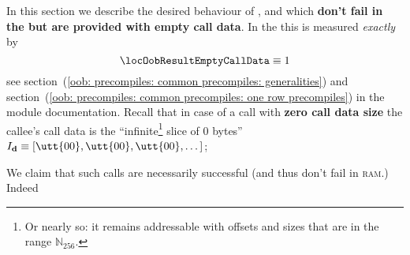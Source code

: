 In this section we describe the desired behaviour of ,  and  which \textbf{don't fail in the \hubMod{} but are provided with empty call data}.
In the \hubMod{} this is measured \emph{exactly} by
\[
	\locOobResultEmptyCallData \equiv 1
\]
see
section~(\ref{oob: precompiles: common precompiles: generalities}) and
section~(\ref{oob: precompiles: common precompiles: one row precompiles})
in the \oobMod{} module documentation.
Recall that in case of a call with \textbf{zero call data size} the callee's call data is the ``infinite\footnote{Or nearly so: it remains addressable with offsets and sizes that are in the range $\mathbb{N}_{256}$.} slice of 0 bytes'' $I_\textbf{d} \equiv [\utt{00},
\utt{00},
\utt{00}, \dots]$;

We claim that such calls are necessarily successful (and thus don't fail in \textsc{ram}.)
Indeed
